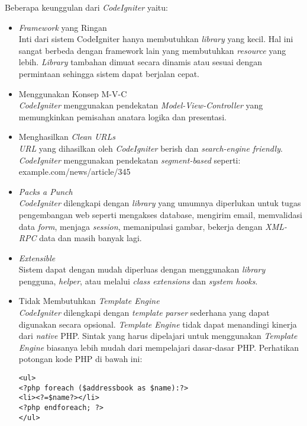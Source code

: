 Beberapa keunggulan dari \textit{CodeIgniter} yaitu:
\begin{itemize}
	\item \textit{Framework} yang Ringan \\
		Inti dari sistem CodeIgniter hanya membutuhkan \textit{library} yang kecil. Hal ini sangat berbeda dengan framework lain yang membutuhkan \textit{resource} yang lebih. \textit{Library} tambahan dimuat secara dinamis atau sesuai dengan permintaan sehingga sistem dapat berjalan cepat.
	\item Menggunakan Konsep M-V-C \\
		\textit{CodeIgniter} menggunakan pendekatan \textit{Model-View-Controller} yang memungkinkan pemisahan anatara logika dan presentasi.
	\item Menghasilkan \textit{Clean URLs} \\
		\textit{URL} yang dihasilkan oleh  \textit{CodeIgniter} berish dan \textit{search-engine friendly}. \textit{CodeIgniter} menggunakan pendekatan \textit{segment-based} seperti: \\example.com/news/article/345
	\item \textit{Packs a Punch} \\
		\textit{CodeIgniter} dilengkapi dengan \textit{library} yang umumnya diperlukan untuk tugas pengembangan web seperti mengakses database, mengirim email, memvalidasi data \textit{form}, menjaga \textit{session}, memanipulasi gambar, bekerja dengan \textit{XML-RPC} data dan masih banyak lagi.
	\item \textit{Extensible} \\
		Sistem dapat dengan mudah diperluas dengan menggunakan \textit{library} pengguna, \textit{helper}, atau melalui \textit{class extensions} dan \textit{system hooks}.
	\item Tidak Membutuhkan \textit{Template Engine} \\
		\textit{CodeIgniter} dilengkapi dengan \textit{template parser} sederhana yang dapat digunakan secara opsional. \textit{Template Engine} tidak dapat menandingi kinerja dari \textit{native} PHP. Sintak yang harus dipelajari untuk menggunakan \textit{Template Engine} biasanya lebih mudah dari mempelajari dasar-dasar PHP. Perhatikan potongan kode PHP di bawah ini: \\
		\begin{lstlisting}[backgroundcolor = \color{lightgray}]
<ul>
<?php foreach ($addressbook as $name):?>
<li><?=$name?></li>
<?php endforeach; ?>
</ul>
	\end{lstlisting}
		

\end{itemize}
